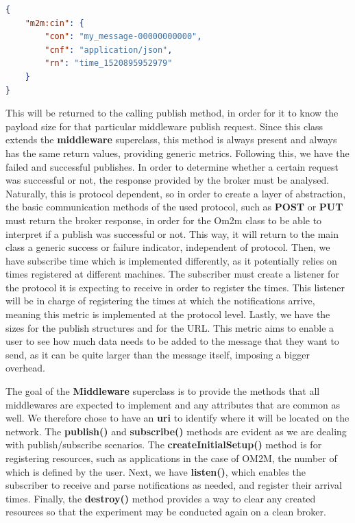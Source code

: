 \documentclass[conference]{IEEEtran}
\begin{document}
\begin{lstlisting}[linewidth=\columnwidth, caption=JSON payload for content instance creation, captionpos=b, label=lst:application_creation, language=json]
{
	"m2m:cin": {
		"con": "my_message-00000000000",
		"cnf": "application/json",
		"rn": "time_1520895952979"
	}
}
\end{lstlisting}
This will be returned to the calling publish method, in order for it to know the payload size for that particular middleware publish request. Since this class extends the \textbf{middleware} superclass, this method is always present and always has the same return values, providing generic metrics.
Following this, we have the failed and successful publishes. In order to determine whether a certain request was successful or not, the response provided by the broker must be analysed. Naturally, this is protocol dependent, so in order to create a layer of abstraction, the basic communication methods of the used protocol, such as \textbf{POST} or \textbf{PUT} must return the broker response, in order for the Om2m class to be able to interpret if a publish was successful or not. This way, it will return to the main class a generic success or failure indicator, independent of protocol. 
Then, we have subscribe time which is implemented differently, as it potentially relies on times registered at different machines. The subscriber must create a listener for the protocol it is expecting to receive in order to register the times. This listener will be in charge of registering the times at which the notifications arrive, meaning this metric is implemented at the protocol level. Lastly, we have the sizes for the publish structures and for the URL\@. This metric aims to enable a user to see how much data needs to be added to the message that they want to send, as it can be quite larger than the message itself, imposing a bigger overhead.

The goal of the \textbf{Middleware} superclass is to provide the methods that all middlewares are expected to implement and any attributes that are common as well. We therefore chose to have an \textbf{uri} to identify where it will be located on the network. The \textbf{publish()} and \textbf{subscribe()} methods are evident as we are dealing with publish/subscribe scenarios. The \textbf{createInitialSetup()} method is for registering resources, such as applications in the case of OM2M, the number of which is defined by the user. Next, we have \textbf{listen()}, which enables the subscriber to receive and parse notifications as needed, and register their arrival times. Finally, the \textbf{destroy()} method provides a way to clear any created resources so that the experiment may be conducted again on a clean broker. 
\end{document}
